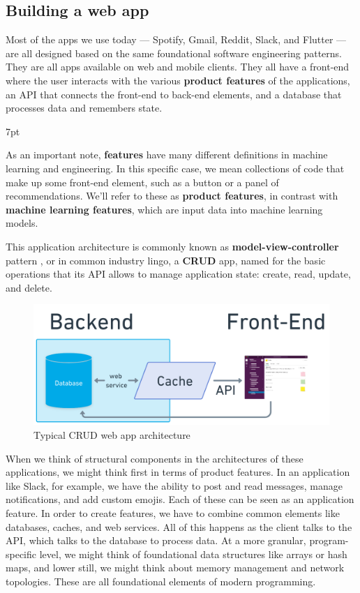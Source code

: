 \documentclass[11pt, table]{diazessay} %
\newenvironment{formal}{%
  \def\FrameCommand{%
	\hspace{1pt}%
	{\color{w_lightblue}\vrule width 2pt}%
	{\color{formalshade}\vrule width 4pt}%
	\colorbox{formalshade}%
  }%
  \MakeFramed{\advance\hsize-\width\FrameRestore}%
  \noindent\hspace{-4.55pt}%
  \begin{adjustwidth}{}{7pt}%
  \vspace{2pt}\vspace{2pt}%
}
{%
  \vspace{2pt}\end{adjustwidth}\endMakeFramed%
}
\begin{document}
\begin{sloppypar}
\subsection{Building a web app}

 Most of the apps we use today --- Spotify, Gmail, Reddit, Slack, and Flutter --- are all designed based on the same foundational software engineering patterns. They are all apps available on web and mobile clients. They all have a front-end where the user interacts with the various \textbf{product features} of the applications, an API that connects the front-end to back-end elements, and a database that processes data and remembers state.
 
 \begin{formal}
 As an important note, \textbf{features} have many different definitions in machine learning and engineering. In this specific case, we mean collections of code that make up some front-end element, such as a button or a panel of recommendations. We'll refer to these as \textbf{product features}, in contrast with \textbf{machine learning features}, which are input data into machine learning models.
  \end{formal}
 
 This application architecture is commonly known as \textbf{model-view-controller} pattern \citep{fowler2012patterns}, or in common industry lingo, a \textbf{CRUD} app, named for the basic operations that its API allows to manage application state: create, read, update, and delete.
 
\begin{figure}[H]
\centering
\includegraphics[width=.9\textwidth]{figures/web_service.png}
\caption{Typical CRUD web app architecture}
\end{figure}

When we think of structural components in the architectures of these applications, we might think first in terms of product features. In an application like Slack, for example, we have the ability to post and read messages, manage notifications, and add custom emojis. Each of these can be seen as an application feature. In order to create features, we have to combine common elements like databases, caches, and web services. All of this happens as the client talks to the API, which talks to the database to process data. At a more granular, program-specific level, we might think of foundational data structures like arrays or hash maps, and lower still, we might think about memory management and network topologies. These are all foundational elements of modern programming.


\end{sloppypar}
\end{document}
